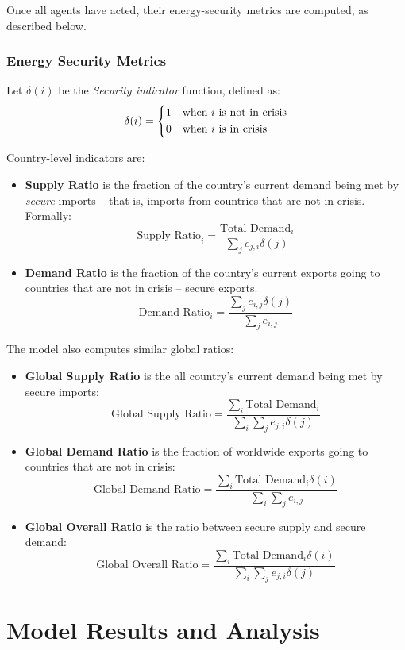\documentclass{llncs}
\begin{document}
Once all agents have acted, their energy-security metrics are computed, as described below.

\subsubsection{Energy Security Metrics}

Let $\delta(i)$ be the \emph{Security indicator} function, defined as:
\[
\delta(i) = \begin{dcases*}
	1 & when $i$ is not in crisis\\
	0 & when $i$ is in crisis
\end{dcases*}
\]

Country-level indicators are:

\begin{itemize}
	\item \textbf{Supply Ratio} is the fraction of the country's current demand being met by \emph{secure} imports -- that is, imports from countries that are not in crisis. Formally:
	$$
		\text{Supply Ratio}_i = \frac{\text{Total Demand}_i}{\sum_{j}e_{j,i}\delta(j)}
	$$
\item \textbf{Demand Ratio} is the fraction of the country's current exports going to countries that are not in crisis -- secure exports. 
$$
\text{Demand Ratio}_i = \frac{\sum_{j}e_{i,j}\delta(j)}{\sum_{j}e_{i,j}}
$$
\end{itemize}

The model also computes similar global ratios:
\begin{itemize}
	\item \textbf{Global Supply Ratio} is the all country's current demand being met by secure imports:
	$$
		\text{Global Supply Ratio} = \frac{\sum_i\text{Total Demand}_i}{\sum_i\sum_{j}e_{j,i}\delta(j)}
	$$
	\item \textbf{Global Demand Ratio} is the fraction of worldwide exports going to countries that are not in crisis:
	$$
		\text{Global Demand Ratio} = \frac{\sum_i \text{Total Demand}_i\delta(i)}{\sum_i\sum_{j}e_{i,j}}
	$$
	\item \textbf{Global Overall Ratio} is the ratio between secure supply and secure demand:
	$$
		\text{Global Overall Ratio} = \frac{\sum_i \text{Total Demand}_i\delta(i)}{\sum_i\sum_{j}e_{j,i}\delta(j)}
	$$
\end{itemize}


\section{Model Results and Analysis}
\end{document}

